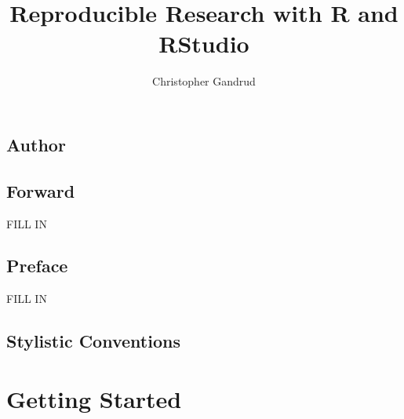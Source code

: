 \documentclass[ChapterTOCs,krantz1]{krantz}\usepackage{graphicx, color}
\begin{document}
\title{Reproducible Research with R and RStudio}

\author{Christopher Gandrud}

\maketitle

\frontmatter

{\chapter*{Author}}





\chapter*{Forward}

FILL IN



\chapter*{Preface}

FILL IN


\chapter*{Stylistic Conventions}\label{StylisticConventions}
\begin{noindent}






\end{noindent}

\listoffigures
\listoftables
\tableofcontents

\mainmatter

\setcounter{page}{1}

\part{Getting Started}

\end{document}
